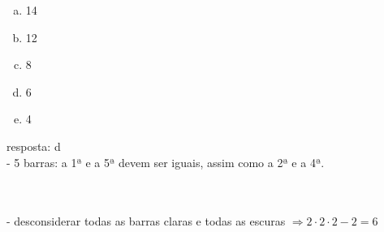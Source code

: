 \begin{ex}
    \begin{enumerate}[(a)]
    \item 14
    \item 12
    \item 8
    \item 6
    \item 4
    \end{enumerate}
      \begin{sol}
        resposta: d \\
        - 5 barras: a 1ª e a 5ª devem ser iguais, assim como a 2ª e a 4ª.\\ \\
           \\
        - desconsiderar todas as barras claras e todas as escuras $\Longrightarrow2\cdot2\cdot2-2=6$
      \end{sol}
\end{ex}